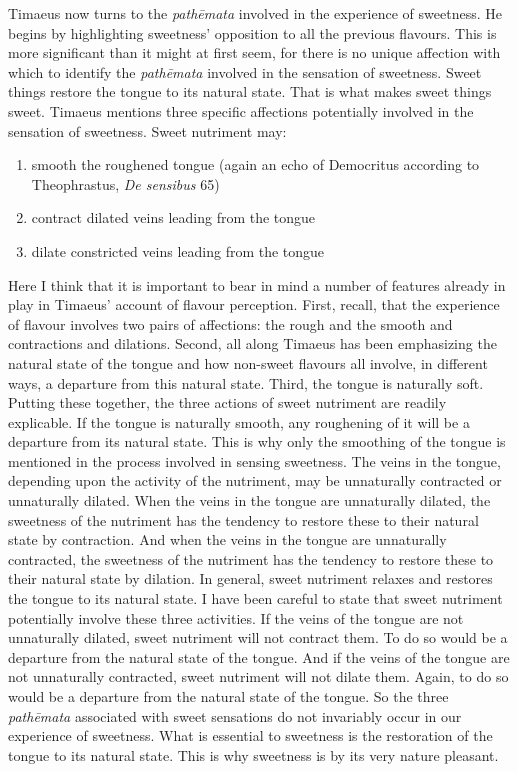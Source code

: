 Timaeus now turns to the \emph{pathēmata} involved in the experience of sweetness. He begins by highlighting sweetness' opposition to all the previous flavours. This is more significant than it might at first seem, for there is no unique affection with which to identify the \emph{pathēmata} involved in the sensation of sweetness. Sweet things restore the tongue to its natural state. That is what makes sweet things sweet. Timaeus mentions three specific affections potentially involved in the sensation of sweetness. Sweet nutriment may:
\begin{enumerate}
	\item smooth the roughened tongue (again an echo of Democritus according to Theophrastus, \emph{De sensibus} 65)
	\item contract dilated veins leading from the tongue
	\item dilate constricted veins leading from the tongue
\end{enumerate}
Here I think that it is important to bear in mind a number of features already in play in Timaeus' account of flavour perception. First, recall, that the experience of flavour involves two pairs of affections: the rough and the smooth and contractions and dilations. Second, all along Timaeus has been emphasizing the natural state of the tongue and how non-sweet flavours all involve, in different ways, a departure from this natural state. Third, the tongue is naturally soft. Putting these together, the three actions of sweet nutriment are readily explicable. If the tongue is naturally smooth, any roughening of it will be a departure from its natural state. This is why only the smoothing of the tongue is mentioned in the process involved in sensing sweetness. The veins in the tongue, depending upon the activity of the nutriment, may be unnaturally contracted or unnaturally dilated. When the veins in the tongue are unnaturally dilated, the sweetness of the nutriment has the tendency to restore these to their natural state by contraction. And when the veins in the tongue are unnaturally contracted, the sweetness of the nutriment has the tendency to restore these to their natural state by dilation. In general, sweet nutriment relaxes and restores the tongue to its natural state. I have been careful to state that sweet nutriment potentially involve these three activities. If the veins of the tongue are not unnaturally dilated, sweet nutriment will not contract them. To do so would be a departure from the natural state of the tongue. And if the veins of the tongue are not unnaturally contracted, sweet nutriment will not dilate them. Again, to do so would be a departure from the natural state of the tongue. So the three \emph{pathēmata} associated with sweet sensations do not invariably occur in our experience of sweetness. What is essential to sweetness is the restoration of the tongue to its natural state. This is why sweetness is by its very nature pleasant.

